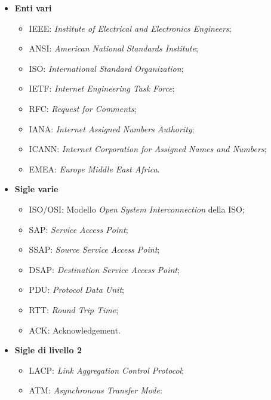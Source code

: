 \begin{itemize}

\item{\textbf{Enti vari}}

\begin{itemize}

\item{IEEE}: \emph{Institute of Electrical and Electronics Engineers};
\item{ANSI}: \emph{American National Standards Institute};
\item{ISO}: \emph{International Standard Organization};
\item{IETF}: \emph{Internet Engineering Task Force};
\item{RFC}: \emph{Request for Comments};
\item{IANA}: \emph{Internet Assigned Numbers Authority};
\item{ICANN}: \emph{Internet Corporation for Assigned Names and Numbers};
\item{EMEA}: \emph{Europe Middle East Africa}.

\end{itemize}

\item{\textbf{Sigle varie}}

\begin{itemize}

\item{ISO/OSI}: Modello \emph{Open System Interconnection} della ISO;
\item{SAP}: \emph{Service Access Point};
\item{SSAP}: \emph{Source Service Access Point};
\item{DSAP}: \emph{Destination Service Access Point};
\item{PDU}: \emph{Protocol Data Unit};
\item{RTT}: \emph{Round Trip Time};
\item{ACK}: Acknowledgement.

\end{itemize}

\item{\textbf{Sigle di livello 2}}

\begin{itemize}

\item{LACP}: \emph{Link Aggregation Control Protocol};
\item{ATM}: \emph{Asynchronous Transfer Mode}:

\begin{itemize}


\end{itemize}
\end{itemize}
\end{itemize}
